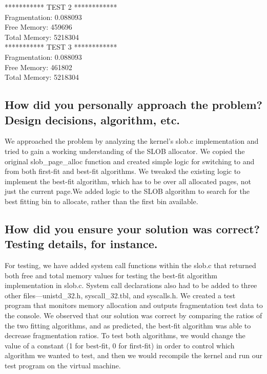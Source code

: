 \documentclass[onecolumn, draftclsnofoot,10pt, compsoc]{IEEEtran}
\begin{document}
\noindent************ TEST 2 ************\\
Fragmentation: 0.088093\\
Free Memory: 459696\\
Total Memory: 5218304\\

\noindent************ TEST 3 ************\\
Fragmentation: 0.088093\\
Free Memory: 461802\\
Total Memory: 5218304\\


\subsection{How did you personally approach the problem? Design decisions, algorithm, etc.}
\noindent We approached the problem by analyzing the kernel's slob.c implementation and tried to gain a working understanding of the SLOB allocator. We copied the original slob\_page\_alloc function and created simple logic for switching to and from both first-fit and best-fit algorithms. We tweaked the existing logic to implement the best-fit algorithm, which has to be over all allocated pages, not just the current page.We added logic to the SLOB algorithm to search for the best fitting bin to allocate, rather than the first bin available.

\subsection{How did you ensure your solution was correct? Testing details, for instance.}
\noindent For testing, we have added system call functions within the slob.c that returned both free and total memory values for testing the best-fit algorithm implementation in slob.c. System call declarations also had to be added to three other files---unistd\_32.h, syscall\_32.tbl, and syscalls.h. We created a test program that monitors memory allocation and outputs fragmentation test data to the console. We observed that our solution was correct by comparing the ratios of the two fitting algorithms, and as predicted, the best-fit algorithm was able to decrease fragmentation ratios. To test both algorithms, we would change the value of a constant (1 for best-fit, 0 for first-fit) in order to control which algorithm we wanted to test, and then we would recompile the kernel and run our test program on the virtual machine.\\
\end{document}
